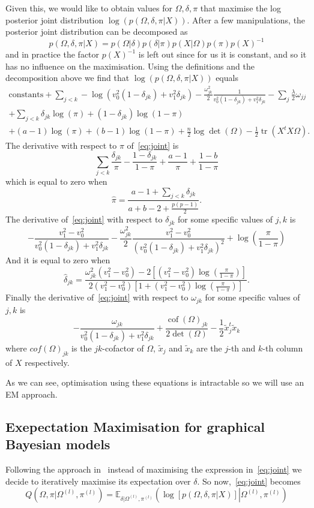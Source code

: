 \documentclass{scrartcl}
\DeclareMathOperator{\tr}{tr}
\DeclareMathOperator{\cof}{cof}
\newcommand{\powl}{^{(l)}}
\newcommand{\inv}{^{-1}}
\begin{document}
Given this, we would like to obtain values for $\Omega, \delta, \pi$ that
maximise the log posterior joint distribution $\log(p(\Omega, \delta, \pi |
	X))$. After a few manipulations, the posterior joint distribution can be
decomposed as \[ p(\Omega, \delta, \pi | X) = p(\Omega | \delta) p(\delta |
	\pi) p(X | \Omega) p(\pi) p(X)\inv \] and in practice the factor $p(X)\inv$ is
left out since for us it is constant, and so it has no influence on the
maximisation. Using the definitions and the decomposition above we find that
$\log(p(\Omega, \delta, \pi | X))$ equals
\begin{multline}\label{eq:joint}
	\text{constants} + \sum_{j<k} -\log(v_0^2 (1 - \delta_{jk}) + v_1^2 \delta_{jk}) - \frac{\omega^2_{jk}}{2} \frac{1}{v_0^2 (1 - \delta_{jk}) + v_1^2 \delta_{jk}} - \sum_j \frac{\lambda}{2} \omega_{jj} \\
	+ \sum_{j < k} \delta_{jk} \log(\pi) + (1 - \delta_{jk})\log(1 - \pi)                                                                                                                \\
	+ (a-1) \log(\pi) + (b-1)\log(1 - \pi) + \frac{n}{2} \log\det(\Omega) -\frac{1}{2}\tr (X^t X \Omega).
\end{multline}
The derivative with respect to $\pi$ of~\cref{eq:joint} is
\[\sum_{j<k}  \frac{\delta_{jk}}{\pi} - \frac{1-\delta_{jk}}{1-\pi} + \frac{a-1}{\pi} + \frac{1-b}{1-\pi}\]
which is equal to zero when
\[\hat \pi = \frac{a - 1 + \sum_{j<k} \delta_{jk}} {a + b - 2 + \frac{p(p-1)}{2}}.\]
The derivative of~\cref{eq:joint} with respect to $\delta_{jk}$ for some
specific values of $j,k$ is
\[
	-\frac{v_1^2 - v_0^2}{v_0^2(1 - \delta_{jk}) + v_1^2 \delta_{jk}} -
	\frac{\omega_{jk}^2}{2} \frac{v_1^2 - v_0^2}{(v_0^2(1 - \delta_{jk}) +
		v_1^2 \delta_{jk})^2} + \log\left(\frac{\pi}{1 - \pi}\right)
\]
And it is equal to zero when
\[
	\hat \delta_{jk} = \frac{\omega_{jk}^2 (v_1^2 - v_0^2) - 2\left[(v_1^2 -
			v_0^2) \log\left(\frac{\pi}{1-\pi}\right)\right]}{2 (v_1^2 - v_0^2)\left[1
			+ (v_1^2 - v_0^2) \log\left(\frac{\pi}{1-\pi}\right)\right]}.
\]
Finally the derivative of~\cref{eq:joint} with respect to $\omega_{jk}$ for
some specific values of $j,k$ is
\[
	-\frac{\omega_{jk}}{v_0^2(1 - \delta_{jk}) + v_1^2 \delta_{jk}} + \frac{\cof(\Omega)_{jk}}{2 \det(\Omega)} -\frac{1}{2} \tilde x_j^t \tilde x_k
\]
where $cof(\Omega)_{jk}$ is the $jk$-cofactor of $\Omega$, $\tilde x_j$ and
$\tilde x_k$ are the $j$-th and $k$-th column of $X$ respectively.

As we can see, optimisation using these equations is intractable so we will use an EM approach.

\subsection{Exepectation Maximisation for graphical Bayesian models}
Following the approach in~\cite{limcco-2017} instead of maximising the
expression in~\cref{eq:joint} we decide to iteratively maximise its expectation
over $\delta$. So now,~\cref{eq:joint} becomes
\[
	Q(\Omega, \pi| \Omega\powl, \pi\powl) = \mathbb{E}_{\delta|\Omega\powl, \pi\powl}\left(\log[p(\Omega, \delta, \pi| X)]\left|  \Omega\powl, \pi\powl\right.\right)
\]

\printbibliography
\end{document}
